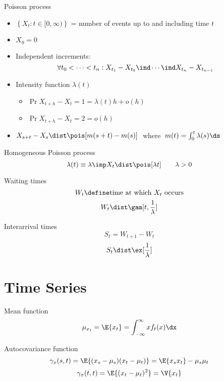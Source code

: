 \documentclass[landscape]{article}
\begin{document}
\begin{multicols*}{2}
Poisson process
\begin{itemize}
  \item $\left\{ X_t : t \in [0,\infty) \right\}$
    = number of events up to and including time $t$
  \item $X_0 = 0$
  \item Independent increments:
    \[\forall t_0 < \cdots < t_n:
    X_{t_1} - X_{t_0} \ind \cdots \ind X_{t_n} - X_{t_{n-1}}\]
  \item Intensity function $\lambda(t)$
    \begin{itemize}
      \item $\Pr{X_{t+h}-X_t = 1} = \lambda(t) h + o(h)$
      \item $\Pr{X_{t+h}-X_t = 2} = o(h)$
    \end{itemize}
  \item $X_{s+t} - X_s \dist \pois[m(s+t)-m(s)]\;$ where
    $\;m(t)=\int_0^t\lambda(s)\ds$
\end{itemize}

Homogeneous Poisson process
\[\lambda(t) \equiv \lambda \imp X_t \dist \pois[\lambda t] \qquad \lambda > 0\]

Waiting times
\[W_t \define \text{time at which $X_t$ occurs}\]
\[W_t \dist \gam[t, \frac{1}{\lambda}]\]

Interarrival times
\[S_t = W_{t+1} - W_t\]
\[S_t \dist \ex[\frac{1}{\lambda}]\]

\begin{center}
\end{center}

\section{Time Series}

Mean function
\[\mu_{x_t} = \E{x_t} = \int_{-\infty}^\infty x f_t(x) \dx\]

Autocovariance function
\[\gamma_x(s,t) = \E{(x_s-\mu_s)(x_t-\mu_t)} = \E{x_sx_t} - \mu_s\mu_t\]
\[\gamma_x(t,t) = \E{(x_t-\mu_t)^2} = \V{x_t}\]


\end{multicols*}
\end{document}
